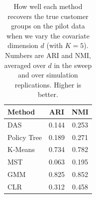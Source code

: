 \begin{table}[htbp]
\centering
\caption{How well each method recovers the true customer groups on the pilot data when we vary the covariate dimension $d$ (with $K=5$). Numbers are ARI and NMI, averaged over $d$ in the sweep and over simulation replications. Higher is better.}
\label{tab:app-ari-nmi-varying-d-avg}
\begin{tabular}{lcc}
\toprule
Method & ARI & NMI \\
\midrule
DAS & 0.144 & 0.253 \\
Policy Tree & 0.189 & 0.271 \\
K-Means & 0.734 & 0.782 \\
MST & 0.063 & 0.195 \\
GMM & 0.825 & 0.852 \\
CLR & 0.312 & 0.458 \\
\bottomrule
\end{tabular}
\end{table}
